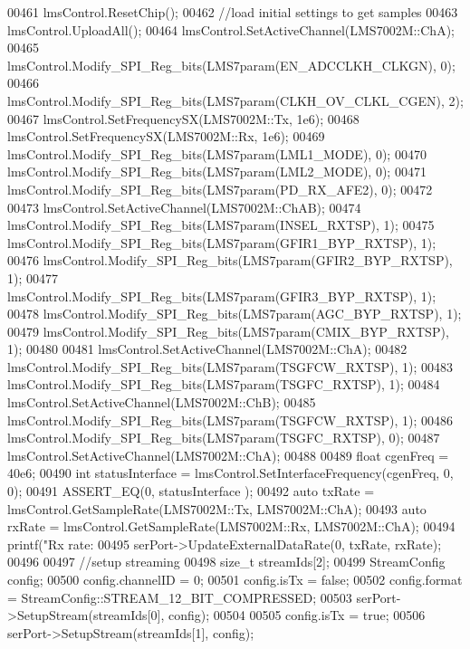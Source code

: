 \begin{DoxyCode}
{{{{00461     lmsControl.ResetChip();
00462     \textcolor{comment}{//load initial settings to get samples}
00463     lmsControl.UploadAll();
00464     lmsControl.SetActiveChannel(LMS7002M::ChA);
00465     lmsControl.Modify_SPI_Reg_bits(LMS7param(EN_ADCCLKH_CLKGN), 0);
00466     lmsControl.Modify_SPI_Reg_bits(LMS7param(CLKH_OV_CLKL_CGEN), 2);
00467     lmsControl.SetFrequencySX(LMS7002M::Tx, 1e6);
00468     lmsControl.SetFrequencySX(LMS7002M::Rx, 1e6);
00469     lmsControl.Modify_SPI_Reg_bits(LMS7param(LML1_MODE), 0);
00470     lmsControl.Modify_SPI_Reg_bits(LMS7param(LML2_MODE), 0);
00471     lmsControl.Modify_SPI_Reg_bits(LMS7param(PD_RX_AFE2), 0);
00472 
00473     lmsControl.SetActiveChannel(LMS7002M::ChAB);
00474     lmsControl.Modify_SPI_Reg_bits(LMS7param(INSEL_RXTSP), 1);
00475     lmsControl.Modify_SPI_Reg_bits(LMS7param(GFIR1_BYP_RXTSP), 1);
00476     lmsControl.Modify_SPI_Reg_bits(LMS7param(GFIR2_BYP_RXTSP), 1);
00477     lmsControl.Modify_SPI_Reg_bits(LMS7param(GFIR3_BYP_RXTSP), 1);
00478     lmsControl.Modify_SPI_Reg_bits(LMS7param(AGC_BYP_RXTSP), 1);
00479     lmsControl.Modify_SPI_Reg_bits(LMS7param(CMIX_BYP_RXTSP), 1);
00480 
00481     lmsControl.SetActiveChannel(LMS7002M::ChA);
00482     lmsControl.Modify_SPI_Reg_bits(LMS7param(TSGFCW_RXTSP), 1);
00483     lmsControl.Modify_SPI_Reg_bits(LMS7param(TSGFC_RXTSP), 1);
00484     lmsControl.SetActiveChannel(LMS7002M::ChB);
00485     lmsControl.Modify_SPI_Reg_bits(LMS7param(TSGFCW_RXTSP), 1);
00486     lmsControl.Modify_SPI_Reg_bits(LMS7param(TSGFC_RXTSP), 0);
00487     lmsControl.SetActiveChannel(LMS7002M::ChA);
00488 
00489     \textcolor{keywordtype}{float} cgenFreq = 40e6;
00490     \textcolor{keywordtype}{int} statusInterface = lmsControl.SetInterfaceFrequency(cgenFreq, 0, 0);
00491     ASSERT\_EQ(0, statusInterface );
00492     \textcolor{keyword}{auto} txRate = lmsControl.GetSampleRate(LMS7002M::Tx, LMS7002M::ChA);
00493     \textcolor{keyword}{auto} rxRate = lmsControl.GetSampleRate(LMS7002M::Rx, LMS7002M::ChA);
00494     printf(\textcolor{stringliteral}{"Rx rate: %
00495     serPort->UpdateExternalDataRate(0, txRate, rxRate);
00496 
00497     \textcolor{comment}{//setup streaming}
00498     \textcolor{keywordtype}{size\_t} streamIds[2];
00499     StreamConfig config;
00500     config.channelID = 0;
00501     config.isTx = \textcolor{keyword}{false};
00502     config.format = StreamConfig::STREAM\_12\_BIT\_COMPRESSED;
00503     serPort->SetupStream(streamIds[0], config);
00504 
00505     config.isTx = \textcolor{keyword}{true};
00506     serPort->SetupStream(streamIds[1], config);
}}}}}
\end{DoxyCode}
